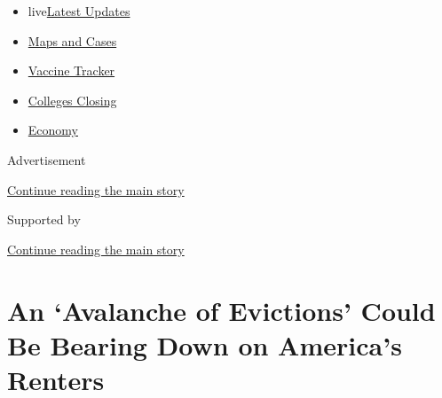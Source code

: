 \begin{itemize}
\tightlist
\item
  live\href{https://www.nytimes3xbfgragh.onion/2020/08/21/world/covid-19-coronavirus.html?name=styln-coronavirus-national\&region=TOP_BANNER\&variant=undefined\&block=storyline_menu_recirc\&action=click\&pgtype=Article\&impression_id=acc5c331-e397-11ea-922b-e97d4ae673ca}{Latest
  Updates}
\item
  \href{https://www.nytimes3xbfgragh.onion/interactive/2020/us/coronavirus-us-cases.html?name=styln-coronavirus-national\&region=TOP_BANNER\&variant=undefined\&block=storyline_menu_recirc\&action=click\&pgtype=Article\&impression_id=acc5c332-e397-11ea-922b-e97d4ae673ca}{Maps
  and Cases}
\item
  \href{https://www.nytimes3xbfgragh.onion/interactive/2020/science/coronavirus-vaccine-tracker.html?name=styln-coronavirus-national\&region=TOP_BANNER\&variant=undefined\&block=storyline_menu_recirc\&action=click\&pgtype=Article\&impression_id=acc5c333-e397-11ea-922b-e97d4ae673ca}{Vaccine
  Tracker}
\item
  \href{https://www.nytimes3xbfgragh.onion/2020/08/19/us/colleges-closing-covid.html?name=styln-coronavirus-national\&region=TOP_BANNER\&variant=undefined\&block=storyline_menu_recirc\&action=click\&pgtype=Article\&impression_id=acc5ea40-e397-11ea-922b-e97d4ae673ca}{Colleges
  Closing}
\item
  \href{https://www.nytimes3xbfgragh.onion/live/2020/08/20/business/stock-market-today-coronavirus?name=styln-coronavirus-national\&region=TOP_BANNER\&variant=undefined\&block=storyline_menu_recirc\&action=click\&pgtype=Article\&impression_id=acc5ea41-e397-11ea-922b-e97d4ae673ca}{Economy}
\end{itemize}

Advertisement

\protect\hyperlink{after-top}{Continue reading the main story}

Supported by

\protect\hyperlink{after-sponsor}{Continue reading the main story}

\hypertarget{an-avalanche-of-evictions-could-be-bearing-down-on-americas-renters}{%
\section{An `Avalanche of Evictions' Could Be Bearing Down on America's
Renters}\label{an-avalanche-of-evictions-could-be-bearing-down-on-americas-renters}}

